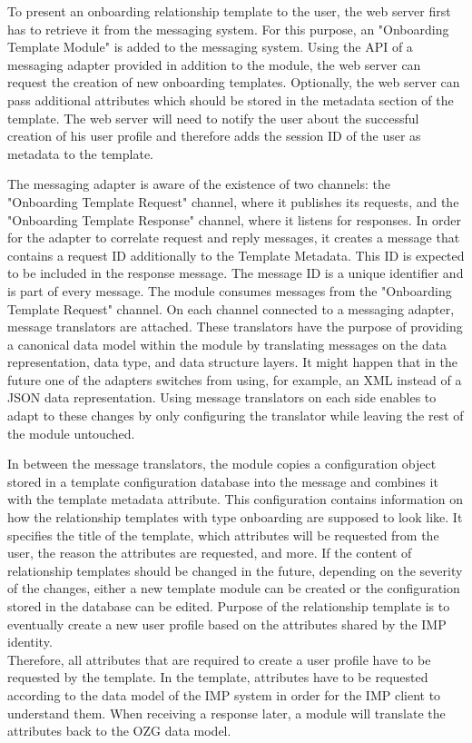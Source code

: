 To present an onboarding relationship template to the user, the web server first has to retrieve it from the messaging system. For this purpose, an "Onboarding Template Module" is added to the messaging system. Using the API of a messaging adapter provided in addition to the module, the web server can request the creation of new onboarding templates. Optionally, the web server can pass additional attributes which should be stored in the metadata section of the template. The web server will need to notify the user about the successful creation of his user profile and therefore adds the session ID of the user as metadata to the template.

The messaging adapter is aware of the existence of two channels: the "Onboarding Template Request" channel, where it publishes its requests, and the "Onboarding Template Response" channel, where it listens for responses. In order for the adapter to correlate request and reply messages, it creates a message that contains a request ID additionally to the Template Metadata. This ID is expected to be included in the response message. The message ID is a unique identifier and is part of every message. The module consumes messages from the "Onboarding Template Request" channel. On each channel connected to a messaging adapter, message translators are attached. These translators have the purpose of providing a canonical data model within the module by translating messages on the data representation, data type, and data structure layers. It might happen that in the future one of the adapters switches from using, for example, an XML instead of a JSON data representation. Using message translators on each side enables to adapt to these changes by only configuring the translator while leaving the rest of the module untouched.

In between the message translators, the module copies a configuration object stored in a template configuration database into the message and combines it with the template metadata attribute. This configuration contains information on how the relationship templates with type onboarding are supposed to look like. It specifies the title of the template, which attributes will be requested from the user, the reason the attributes are requested, and more. If the content of relationship templates should be changed in the future, depending on the severity of the changes, either a new template module can be created or the configuration stored in the database can be edited. Purpose of the relationship template is to eventually create a new user profile based on the attributes shared by the IMP identity. \\ 
Therefore, all attributes that are required to create a user profile have to be requested by the template. In the template, attributes have to be requested according to the data model of the IMP system in order for the IMP client to understand them. When receiving a response later, a module will translate the attributes back to the OZG data model.

